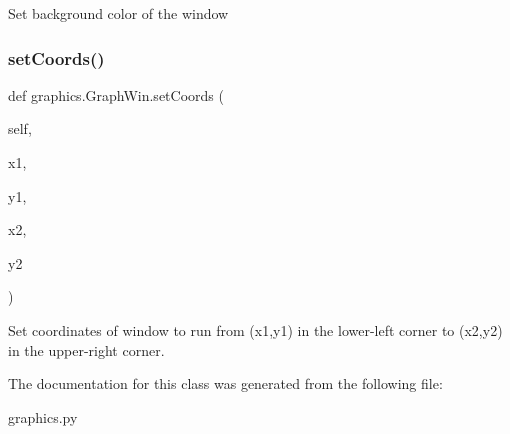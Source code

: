 \begin{DoxyVerb}Set background color of the window\end{DoxyVerb}
 \mbox{\label{classgraphics_1_1_graph_win_a9f5ef08db39c026392b093c2d0a7fbe9}} 
\subsubsection{\texorpdfstring{set\+Coords()}{setCoords()}}
{\footnotesize\ttfamily def graphics.\+Graph\+Win.\+set\+Coords (\begin{DoxyParamCaption}\item[{}]{self,  }\item[{}]{x1,  }\item[{}]{y1,  }\item[{}]{x2,  }\item[{}]{y2 }\end{DoxyParamCaption})}

\begin{DoxyVerb}Set coordinates of window to run from (x1,y1) in the
lower-left corner to (x2,y2) in the upper-right corner.\end{DoxyVerb}
 

The documentation for this class was generated from the following file\+:\begin{DoxyCompactItemize}
\item 
graphics.\+py\end{DoxyCompactItemize}
